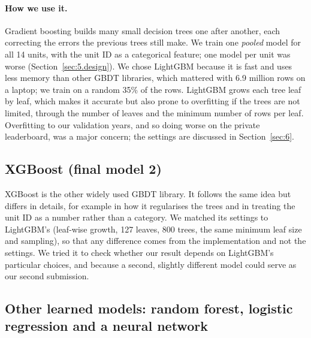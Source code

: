 \paragraph{How we use it.} Gradient boosting builds many small decision trees one after another, each correcting the errors the previous trees still make. We train one \emph{pooled} model for all 14 units, with the unit ID as a categorical feature; one model per unit was worse (Section~\ref{sec:5.design}). We chose LightGBM \citep{ke2017lightgbm} because it is fast and uses less memory than other GBDT libraries, which mattered with 6.9 million rows on a laptop; we train on a random 35\% of the rows. LightGBM grows each tree leaf by leaf, which makes it accurate but also prone to overfitting if the trees are not limited, through the number of leaves and the minimum number of rows per leaf. Overfitting to our validation years, and so doing worse on the private leaderboard, was a major concern; the settings are discussed in Section~\ref{sec:6}.

\subsection{XGBoost (final model 2)}\label{sec:5.xgb}

XGBoost \citep{chen2016xgboost} is the other widely used GBDT library. It follows the same idea but differs in details, for example in how it regularises the trees and in treating the unit ID as a number rather than a category. We matched its settings to LightGBM's (leaf-wise growth, 127 leaves, 800 trees, the same minimum leaf size and sampling), so that any difference comes from the implementation and not the settings. We tried it to check whether our result depends on LightGBM's particular choices, and because a second, slightly different model could serve as our second submission.

\subsection{Other learned models: random forest, logistic regression and a neural network}\label{sec:5.others}

